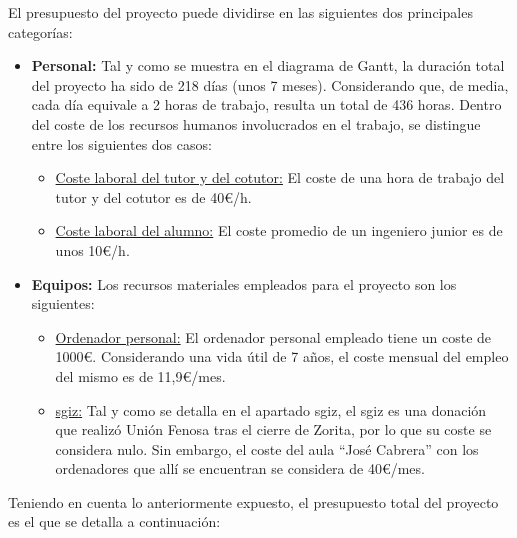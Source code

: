     El presupuesto del proyecto puede dividirse en las siguientes dos principales categorías:

    \begin{itemize}
      \item \textbf{Personal:} Tal y como se muestra en el diagrama de Gantt, la duración total del proyecto ha sido de 218 días (unos 7 meses). Considerando que, de media, cada día equivale a 2 horas de trabajo, resulta un total de 436 horas. Dentro del coste de los recursos humanos involucrados en el trabajo, se distingue entre los siguientes dos casos:
      \begin{itemize}
        \item \underline{Coste laboral del tutor y del cotutor:} El coste de una hora de trabajo del tutor y del cotutor es de 40€/h.
        \item \underline{Coste laboral del alumno:} El coste promedio de un ingeniero junior es de unos 10€/h.
      \end{itemize} 
      \item \textbf{Equipos:} Los recursos materiales empleados para el proyecto son los siguientes:
      \begin{itemize}
        \item \underline{Ordenador personal:} El ordenador personal empleado tiene un coste de 1000€. Considerando una vida útil de 7 años, el coste mensual del empleo del mismo es de 11,9€/mes.
        \item \underline{\acrfull{sgiz}:} Tal y como se detalla en el apartado sgiz, el \acrshort{sgiz} es una donación que realizó Unión Fenosa tras el cierre de Zorita, por lo que su coste se considera nulo. Sin embargo, el coste del aula ``José Cabrera'' con los ordenadores que allí se encuentran se considera de 40€/mes.
      \end{itemize}
    \end{itemize}
    
    Teniendo en cuenta lo anteriormente expuesto, el presupuesto total del proyecto es el que se detalla a continuación:
    
